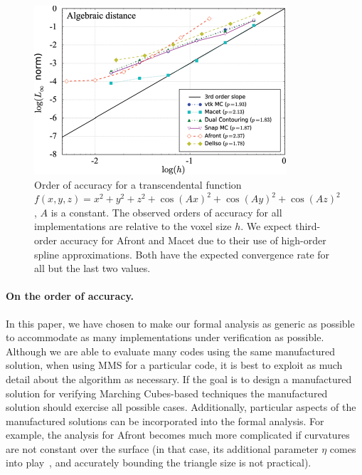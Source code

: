 \begin{figure}[b]
\centering
\includegraphics[width=0.6\linewidth,keepaspectratio=true]{chapter2/figures/afront_meshconv-onh.pdf}
  \caption{Order of accuracy for a transcendental function 
$f(x,y,z) = x^2 + y^2 + z^2 + \cos(Ax)^2 + \cos(Ay)^2 + \cos(Az)^2$, $A$ 
is a constant. The observed orders of accuracy for all implementations 
are relative to the voxel size $h$.
We expect third-order accuracy for 
Afront and Macet due to their use of high-order spline approximations.
Both have the expected convergence rate for all but the last two values.}
  \label{fig:afront-meshconvonh}
\end{figure}


\paragraph*{On the order of accuracy.}
In this paper, we have chosen to make our formal analysis as generic
as possible to accommodate as many implementations under verification
as possible. Although we are able to evaluate many codes using the same 
manufactured solution, when using MMS for a particular code, it is best to
exploit as much detail about the algorithm as necessary. If the goal is to 
design a manufactured solution for verifying Marching Cubes-based techniques 
the manufactured solution should exercise all possible cases. %
Additionally, particular aspects of the manufactured solutions can be
incorporated into the formal analysis. For example, the analysis for
Afront becomes much more complicated if curvatures are not constant
over the surface (in that case, its additional parameter $\eta$ comes
into play~\cite{Schreiner06}, and accurately bounding the triangle
size is not practical).


